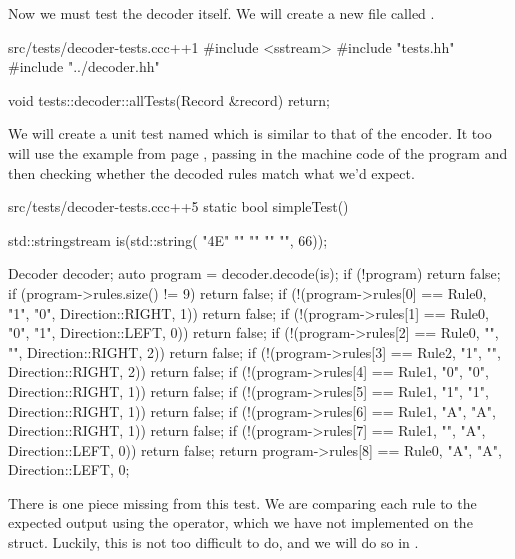 Now we must test the decoder itself. We will create a new file called .

\begin{file}{src/tests/decoder-tests.cc}{c++}{1}
#include <sstream>
#include "tests.hh"
#include "../decoder.hh"

void tests::decoder::allTests(Record &record)
{
    return;
}
\end{file}

We will create a unit test named  which is similar to that of the encoder. It too will use the example from page \pageref{program:simpleTest}, passing in the machine code of the program and then checking whether the decoded rules match what we'd expect.

\begin{file}{src/tests/decoder-tests.cc}{c++}{5}
static bool simpleTest()
{
    std::stringstream is(std::string(
        "\x4E"
        ""
        ""
        ""
        "", 66));

    Decoder decoder;
    auto program = decoder.decode(is);
    if (!program)
        return false;
    if (program->rules.size() != 9)
        return false;
    if (!(program->rules[0] == Rule{0, "1", "0", Direction::RIGHT, 1}))
        return false;
    if (!(program->rules[1] == Rule{0, "0", "1", Direction::LEFT, 0}))
        return false;
    if (!(program->rules[2] == Rule{0, "", "", Direction::RIGHT, 2}))
        return false;
    if (!(program->rules[3] == Rule{2, "1", "", Direction::RIGHT, 2}))
        return false;
    if (!(program->rules[4] == Rule{1, "0", "0", Direction::RIGHT, 1}))
        return false;
    if (!(program->rules[5] == Rule{1, "1", "1", Direction::RIGHT, 1}))
        return false;
    if (!(program->rules[6] == Rule{1, "A", "A", Direction::RIGHT, 1}))
        return false;
    if (!(program->rules[7] == Rule{1, "", "A", Direction::LEFT, 0}))
        return false;
    return program->rules[8] == Rule{0, "A", "A", Direction::LEFT, 0};
}
\end{file}

There is one piece missing from this test. We are comparing each rule to the expected output using the \cpp{==} operator, which we have not implemented on the  struct. Luckily, this is not too difficult to do, and we will do so in .


